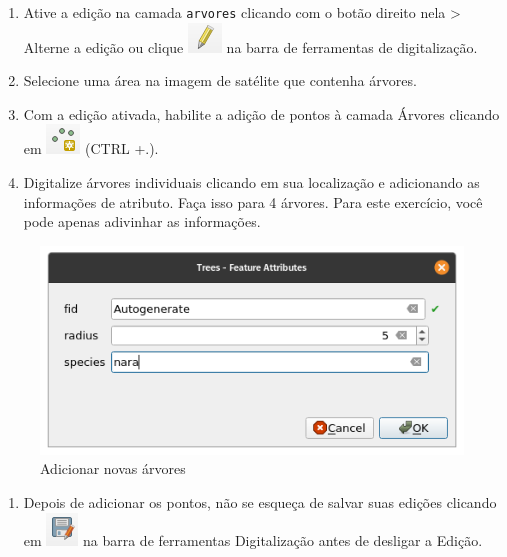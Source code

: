 \documentclass[
  portuguese,
]{krantz}
\providecommand{\tightlist}{%
  \setlength{\itemsep}{0pt}\setlength{\parskip}{0pt}}
\begin{document}
\begin{enumerate}
\def\labelenumi{\arabic{enumi}.}
\setcounter{enumi}{3}
\tightlist
\item
  Ative a edição na camada \texttt{arvores} clicando com o botão direito nela \textgreater{} Alterne a edição ou clique \includegraphics{media/modulo2/symbol-edit.png} na barra de ferramentas de digitalização.
\item
  Selecione uma área na imagem de satélite que contenha árvores.
\item
  Com a edição ativada, habilite a adição de pontos à camada Árvores clicando em \includegraphics{media/modulo2/symbol-add-point.png} (CTRL +.).
\item
  Digitalize árvores individuais clicando em sua localização e adicionando as informações de atributo. Faça isso para 4 árvores. Para este exercício, você pode apenas adivinhar as informações.
\end{enumerate}

\begin{figure}
\centering
\includegraphics{media/modulo2/virtual-3.png}
\caption{Adicionar novas árvores}
\end{figure}

\begin{enumerate}
\def\labelenumi{\arabic{enumi}.}
\setcounter{enumi}{7}
\tightlist
\item
  Depois de adicionar os pontos, não se esqueça de salvar suas edições clicando em \includegraphics{media/modulo2/symbol-save-edits.png} na barra de ferramentas Digitalização antes de desligar a Edição.
\end{enumerate}
\end{document}
